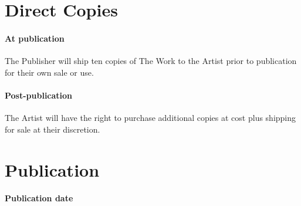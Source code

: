 \documentclass[12pt,letterpaper]{article}
\def\PrintRoyalties{25\%}
\def\DigitalRoyalties{50\%}
\def\PaymentMechanism{PayPal} %
\begin{document}
%
%
%
%
%
%
%

\section{Direct Copies}

\paragraph{At publication} The Publisher will ship ten copies of The Work to the Artist prior to publication for their own sale or use.

\paragraph{Post-publication} The Artist will have the right to purchase additional copies at cost plus shipping for sale at their discretion.

\section{Publication}

\paragraph{Publication date}
\end{document}

